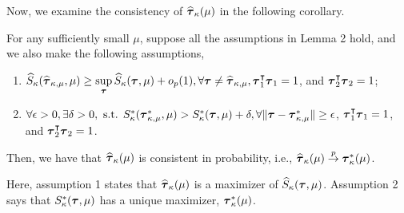 \documentclass[../main.tex]{subfiles}
\begin{document}
Now, we examine the consistency of $\widehat{\boldsymbol{\tau}}_{\kappa}(\mu)$ in the following corollary.
\begin{corollary}
For any sufficiently small $\mu$, suppose all the assumptions in Lemma 2 hold, and we also make the following assumptions,
\begin{enumerate}
\item $\widehat{S}_{\kappa}(\widehat{\boldsymbol{\tau}}_{\kappa,\mu} , \mu) \ge \underset{\boldsymbol{\tau}}\sup\, \widehat{S}_{\kappa}(\boldsymbol{\tau}, \mu) + o_p(1), \forall \boldsymbol{\tau} \neq \widehat{\boldsymbol{\tau}}_{\kappa,\mu},  \boldsymbol{\tau}_1^\intercal \boldsymbol{\tau}_1=1$, and $\boldsymbol{\tau}_2^\intercal \boldsymbol{\tau}_2=1$;
\item $\forall \epsilon > 0, \exists \delta > 0,\text{ s.t. } S^{*}_{\kappa}(\boldsymbol{\tau}^*_{\kappa,\mu}, \mu) > S^{*}_{\kappa}(\boldsymbol{\tau}, \mu) + \delta, \forall \|\boldsymbol{\tau} - \boldsymbol{\tau}^*_{\kappa,\mu} \| \ge \epsilon$, $\boldsymbol{\tau}_1^\intercal \boldsymbol{\tau}_1=1$, and $\boldsymbol{\tau}_2^\intercal \boldsymbol{\tau}_2=1$.	
\end{enumerate}
Then, we have that $\widehat{\boldsymbol{\tau}}_{\kappa}(\mu)$ is consistent in probability, i.e., $\widehat{\boldsymbol{\tau}}_{\kappa}(\mu) \overset{p}\to \boldsymbol{\tau}^*_{\kappa}(\mu)$.
\end{corollary} 

Here, assumption 1 states that $\widehat{\boldsymbol{\tau}}_{\kappa}(\mu)$ is a maximizer of $\widehat{S}_{\kappa}(\boldsymbol{\tau},\mu)$.  Assumption 2 says that $S^*_{\kappa}(\boldsymbol{\tau},\mu)$ has a unique maximizer, $\boldsymbol{\tau}^*_{\kappa}(\mu)$.
\end{document}
